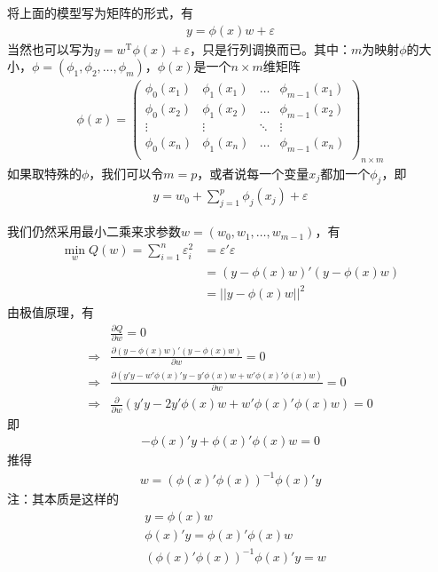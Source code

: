             将上面的模型写为矩阵的形式，有
            \begin{align*}
            y = \phi(x)w + \varepsilon
            \end{align*}
            当然也可以写为$y = w^{\mathrm{T}}\phi(x)+\varepsilon$，只是行列调换而已。其中：$m$为映射$\phi$的大小，$\phi = (\phi_1,\phi_2,\dots,\phi_m)$，$\phi(x)$是一个$n\times m$维矩阵
            \begin{align*}
            \phi(x) =
            \begin{pmatrix}
            \phi_0(x_1)&\phi_1(x_1)&\dots&\phi_{m-1}(x_1)\\
            \phi_0(x_2)&\phi_1(x_2)&\dots&\phi_{m-1}(x_2)\\
            \vdots&\vdots&\ddots&\vdots\\
            \phi_0(x_n)&\phi_1(x_n)&\dots&\phi_{m-1}(x_n)\\
            \end{pmatrix}
            _{n\times m}
            \end{align*}
            如果取特殊的$\phi$，我们可以令$m = p$，或者说每一个变量$x_j$都加一个$\phi_j$，即
            \begin{align*}
            y = w_0 + \sum_{j = 1}^p\phi_j(x_j)+\varepsilon
            \end{align*}
            \par
            我们仍然采用最小二乘来求参数$w = (w_0,w_1,\dots,w_{m-1})$，有
            \begin{align*}
            \min_w  Q(w) = \sum_{i=1}^n \varepsilon_i^2 &= \varepsilon '\varepsilon \\
            &=(y - \phi(x)w) '(y - \phi(x)w)\\
            &=||y - \phi(x)w||^2
            \end{align*}
            由极值原理，有
            \begin{align*}
            &\frac{\partial Q}{\partial w}= 0\\
            \Rightarrow {}& \frac{\partial (y - \phi(x)w) '(y - \phi(x)w)}{\partial w} = 0\\
            \Rightarrow {}& \frac{\partial(y'y - w'\phi(x)'y - y'\phi(x)w + w'\phi(x)'\phi(x)w)}{\partial w} = 0\\
            \Rightarrow {}&\frac{\partial }{\partial w}(y'y - 2y'\phi(x)w+w'\phi(x)'\phi(x)w) = 0
            \end{align*}
            即
            \begin{align*}
            -\phi(x)'y+\phi(x)'\phi(x)w = 0
            \end{align*}
            推得
            \begin{align}
            \label{权重w计算公式}
            w = (\phi(x)'\phi(x))^{-1}\phi(x)'y
            \end{align}
            注：其本质是这样的
            \begin{align*}
            &y = \phi(x)w\\
            &\phi(x)'y = \phi(x)'\phi(x)w\\
            &(\phi(x)'\phi(x))^{-1}\phi(x)'y = w
            \end{align*}

